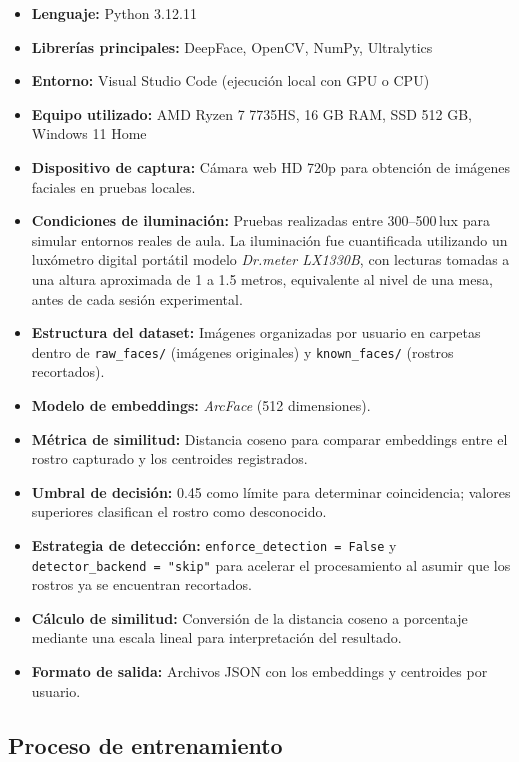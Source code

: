\begin{itemize}
    \item \textbf{Lenguaje:} Python 3.12.11
    \item \textbf{Librerías principales:} DeepFace, OpenCV, NumPy, Ultralytics
    \item \textbf{Entorno:} Visual Studio Code (ejecución local con GPU o CPU)
    \item \textbf{Equipo utilizado:} AMD Ryzen 7 7735HS, 16 GB RAM, SSD 512 GB, Windows 11 Home
    \item \textbf{Dispositivo de captura:} Cámara web HD 720p para obtención de imágenes faciales en pruebas locales.
    \item \textbf{Condiciones de iluminación:} Pruebas realizadas entre 300–500\,lux para simular entornos reales de aula. 
La iluminación fue cuantificada utilizando un luxómetro digital portátil modelo \textit{Dr.meter LX1330B}, con lecturas tomadas a una altura aproximada de 1 a 1.5 metros, equivalente al nivel de una mesa, antes de cada sesión experimental.
    \item \textbf{Estructura del dataset:} Imágenes organizadas por usuario en carpetas dentro de \texttt{raw\_faces/} (imágenes originales) y \texttt{known\_faces/} (rostros recortados).
    \item \textbf{Modelo de embeddings:} \textit{ArcFace} (512 dimensiones).
    \item \textbf{Métrica de similitud:} Distancia coseno para comparar embeddings entre el rostro capturado y los centroides registrados.
    \item \textbf{Umbral de decisión:} 0.45 como límite para determinar coincidencia; valores superiores clasifican el rostro como desconocido.
    \item \textbf{Estrategia de detección:} \texttt{enforce\_detection = False} y \texttt{detector\_backend = "skip"} para acelerar el procesamiento al asumir que los rostros ya se encuentran recortados.
    \item \textbf{Cálculo de similitud:} Conversión de la distancia coseno a porcentaje mediante una escala lineal para interpretación del resultado.
    \item \textbf{Formato de salida:} Archivos JSON con los embeddings y centroides por usuario.
\end{itemize}

\subsection*{Proceso de entrenamiento}

